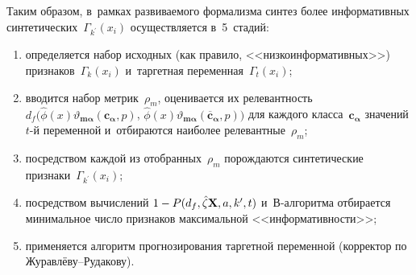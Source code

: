 \begin{multicols}{2}
    Таким образом, в~рамках развиваемого формализма синтез более 
информативных синтетических~$\Gamma_{k^\prime}(x_i)$ осуществляется 
в~5~стадий: 
\begin{enumerate}[(1)]
\item определяется набор исходных (как правило, 
<<низкоинформативных>>) признаков~$\Gamma_k(x_i)$ и~таргетная 
переменная~$\Gamma_t(x_i)$;
\item вводится набор метрик~$\rho_m$, 
оценивается их релевантность $d_f(\hat{\phi}(x)\vartheta_{\mathbf{m}{\bm 
\alpha}}(\mathbf{c}_{\bm \alpha},{p})$,\linebreak 
$\hat{\phi}(x)\vartheta_{\mathbf{m}{\bm \alpha}}(\overline{\mathbf{c}}_{\bm 
\alpha}, {p}))$ для каждого класса~$\mathbf{c}_{\bm \alpha}$ 
значений $t$-й переменной и~отбираются наиболее релевантные~$\rho_m$; 
\item посредством каждой из отобранных~$\rho_m$ по\-рож\-да\-ют\-ся 
синтетические признаки~$\Gamma_{k^\prime}(x_i)$;
\item посредством 
вычислений $1\hm- P(d_f, \hat{\zeta}\mathbf{X}, a, k^\prime, t)$  
и~В-ал\-го\-рит\-ма отбирается минимальное чис\-ло признаков максимальной 
<<ин\-фор\-ма\-тив\-ности>>;
\item применяется алгоритм прогнозирования 
таргетной переменной (корректор по Жу\-рав\-лё\-ву--Ру\-да\-кову). 
\end{enumerate}


\end{multicols}
